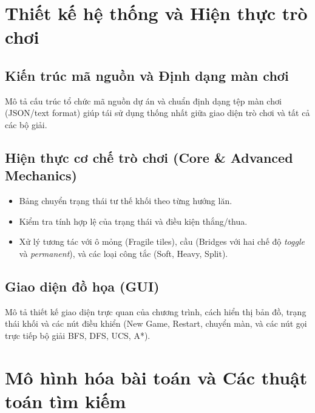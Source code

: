 \documentclass[12pt,a4paper]{article}
\begin{document}
\section{Thiết kế hệ thống và Hiện thực trò chơi}

\subsection{Kiến trúc mã nguồn và Định dạng màn chơi}
Mô tả cấu trúc tổ chức mã nguồn dự án và chuẩn định dạng tệp màn chơi (JSON/text format) giúp tái sử dụng thống nhất giữa giao diện trò chơi và tất cả các bộ giải.

\subsection{Hiện thực cơ chế trò chơi (Core \& Advanced Mechanics)}
\begin{itemize}
    \item Bảng chuyển trạng thái tư thế khối theo từng hướng lăn.
    \item Kiểm tra tính hợp lệ của trạng thái và điều kiện thắng/thua.
    \item Xử lý tương tác với ô mỏng (Fragile tiles), cầu (Bridges với hai chế độ \emph{toggle} và \emph{permanent}), và các loại công tắc (Soft, Heavy, Split).
\end{itemize}

\subsection{Giao diện đồ họa (GUI)}
Mô tả thiết kế giao diện trực quan của chương trình, cách hiển thị bản đồ, trạng thái khối và các nút điều khiển (New Game, Restart, chuyển màn, và các nút gọi trực tiếp bộ giải BFS, DFS, UCS, A*).

\section{Mô hình hóa bài toán và Các thuật toán tìm kiếm}
\end{document}

